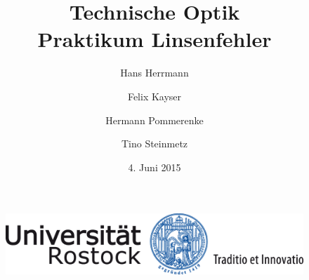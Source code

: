 \documentclass[11pt,fleqn]{article}
\title{Technische Optik \\ Praktikum Linsenfehler}
\date{4. Juni 2015}
\author{Hans Herrmann \and Felix Kayser \and Hermann Pommerenke \and Tino Steinmetz}
\begin{document}
	\begin{figure}[t]
	    \centering
	    \includegraphics[width=115mm]{img/UNI-Logo_Siegel_4c_115mm_07.png}
	\end{figure}

	\maketitle
	
	\thispagestyle{empty}

	\newpage
	\pagestyle{headings}
	\tableofcontents
	
	\everymath{\displaystyle} %
	
	\newpage

	
	
	\clearpage
	
	
	\clearpage
	
	
	\clearpage
	
	
	\clearpage
	\printbibliography
\end{document}
